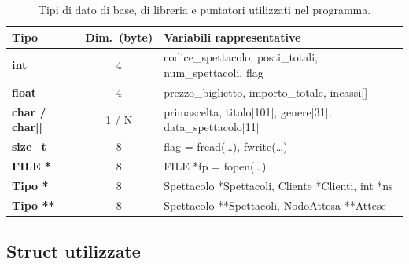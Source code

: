 \documentclass[11pt,a4paper,oneside,openany]{book}
\begin{document}
\begin{table}[H]
\centering
\footnotesize
\renewcommand{\arraystretch}{1.15}
\begin{tabularx}{\textwidth}{>{\ttfamily\bfseries}l c >{\ttfamily}X}
\toprule
\textrm{\textbf{Tipo}} & \textbf{Dim.\ (byte)} & \textrm{\textbf{Variabili rappresentative}} \\
\midrule
int & 4 & codice\_spettacolo, posti\_totali, num\_spettacoli, flag \\
float & 4 & prezzo\_biglietto, importo\_totale, incassi[] \\
char / char[] & 1 / N & primascelta, titolo[101], genere[31], data\_spettacolo[11] \\
size\_t & 8 & flag = fread(\ldots), fwrite(\ldots) \\
FILE * & 8 & FILE *fp = fopen(\ldots) \\
Tipo * & 8 & Spettacolo *Spettacoli, Cliente *Clienti, int *ns \\
Tipo ** & 8 & Spettacolo **Spettacoli, NodoAttesa **Attese \\
\bottomrule
\end{tabularx}
\caption{Tipi di dato di base, di libreria e puntatori utilizzati nel programma.}\label{tab:tipi_base}
\end{table}

\subsection{Struct utilizzate}
\end{document}
